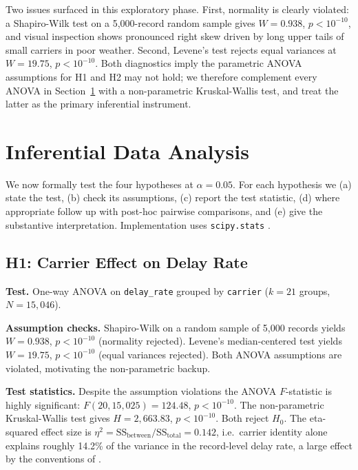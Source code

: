 \documentclass[12pt,letterpaper]{article}
\begin{document}
Two issues surfaced in this exploratory phase. First, normality is
clearly violated: a Shapiro-Wilk test on a 5{,}000-record random sample
gives $W = 0.938$, $p < 10^{-10}$, and visual inspection shows
pronounced right skew driven by long upper tails of small carriers in
poor weather. Second, Levene's test rejects equal variances at
$W = 19.75$, $p < 10^{-10}$. Both diagnostics imply the parametric
ANOVA assumptions for H1 and H2 may not hold; we therefore complement
every ANOVA in Section~\ref{sec:inferential} with a non-parametric
Kruskal-Wallis test, and treat the latter as the primary inferential
instrument.

\section{Inferential Data Analysis}
\label{sec:inferential}

We now formally test the four hypotheses at $\alpha = 0.05$. For each
hypothesis we (a) state the test, (b) check its assumptions, (c) report
the test statistic, (d) where appropriate follow up with post-hoc
pairwise comparisons, and (e) give the substantive interpretation.
Implementation uses \texttt{scipy.stats} \citep{virtanen2020}.

\subsection{H1: Carrier Effect on Delay Rate}
\textbf{Test.} One-way ANOVA on \texttt{delay\_rate} grouped by
\texttt{carrier} ($k = 21$ groups, $N = 15{,}046$).

\textbf{Assumption checks.} Shapiro-Wilk on a random sample of 5{,}000
records yields $W = 0.938$, $p < 10^{-10}$ (normality rejected).
Levene's median-centered test yields $W = 19.75$, $p < 10^{-10}$ (equal
variances rejected). Both ANOVA assumptions are violated, motivating
the non-parametric backup.

\textbf{Test statistics.} Despite the assumption violations the ANOVA
$F$-statistic is highly significant: $F(20, 15{,}025) = 124.48$,
$p < 10^{-10}$. The non-parametric Kruskal-Wallis test gives
$H = 2{,}663.83$, $p < 10^{-10}$. Both reject $H_0$. The eta-squared
effect size is
$\eta^2 = \mathrm{SS}_{\mathrm{between}}/\mathrm{SS}_{\mathrm{total}} = 0.142$,
i.e.\ carrier identity alone explains roughly 14.2\% of the variance in
the record-level delay rate, a large effect by the conventions of
\citet{montgomery2017}.
\end{document}
